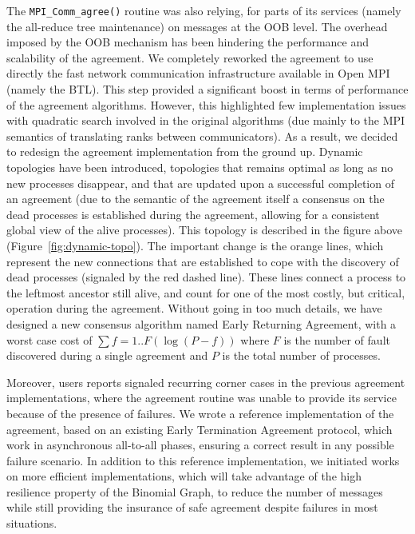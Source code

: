 The {\tt MPI\_Comm\_agree()} routine was also relying, for parts of its
services (namely the all-reduce tree maintenance) on messages at the OOB
level. The overhead imposed by the OOB mechanism has been hindering
the performance and scalability of the agreement. We completely
reworked the agreement to use directly the fast network communication
infrastructure available in Open MPI (namely the BTL). This step
provided a significant boost in terms of performance of the agreement
algorithms. However, this highlighted few implementation issues with
quadratic search involved in the original algorithms (due mainly to
the MPI semantics of translating ranks between communicators). As a
result, we decided to redesign the agreement implementation from the
ground up. Dynamic topologies have been introduced, topologies that
remains optimal as long as no new processes disappear, and that are
updated upon a successful completion of an agreement (due to the
semantic of the agreement itself a consensus on the dead processes is
established during the agreement, allowing for a consistent global
view of the alive processes). This topology is described in the figure
above (Figure~\ref{fig:dynamic-topo}). The important change is the
orange lines, which 
represent the new connections that are established to cope with the
discovery of dead processes (signaled by the red dashed line). These
lines connect a process to the leftmost ancestor still alive, and
count for one of the most costly, but critical, operation during the
agreement. Without going in too much details, we have designed a new
consensus algorithm named Early Returning Agreement, with a worst case
cost of $\sum{f} = 1..F(\log(P-f))$ where $F$ is the number of fault discovered
during a single agreement and $P$ is the total number of processes.

Moreover, users reports signaled recurring corner cases in the
previous agreement implementations, where the agreement routine was
unable to provide its service because of the presence of failures. We
wrote a reference implementation of the agreement, based on an
existing Early Termination Agreement protocol, which work in
asynchronous all-to-all phases, ensuring a correct result in any
possible failure scenario. In addition to this reference
implementation, we initiated works on more efficient implementations,
which will take advantage of the high resilience property of the
Binomial Graph, to reduce the number of messages while still providing
the insurance of safe agreement despite failures in most situations.

